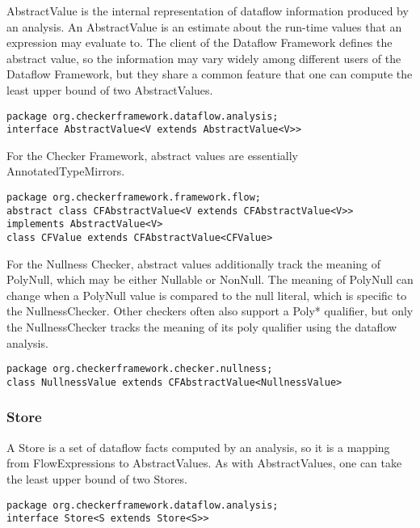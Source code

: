 AbstractValue is the internal representation of dataflow information
produced by an analysis.  An AbstractValue is an estimate about the
run-time values that an expression may evaluate to.  The client of the
Dataflow Framework defines the abstract value, so the information may
vary widely among different users of the Dataflow Framework, but they
share a common feature that one can compute the least upper bound of
two AbstractValues.

\begin{verbatim}
package org.checkerframework.dataflow.analysis;
interface AbstractValue<V extends AbstractValue<V>>
\end{verbatim}

For the Checker Framework, abstract values are essentially
AnnotatedTypeMirrors.

\begin{verbatim}
package org.checkerframework.framework.flow;
abstract class CFAbstractValue<V extends CFAbstractValue<V>> implements AbstractValue<V>
class CFValue extends CFAbstractValue<CFValue>
\end{verbatim}

For the Nullness Checker, abstract values additionally track the
meaning of PolyNull, which may be either Nullable or NonNull.  The
meaning of PolyNull can change when a PolyNull value is compared to
the null literal, which is specific to the NullnessChecker.  Other
checkers often also support a Poly* qualifier, but only the
NullnessChecker tracks the meaning of its poly qualifier using the
dataflow analysis.

\begin{verbatim}
package org.checkerframework.checker.nullness;
class NullnessValue extends CFAbstractValue<NullnessValue>
\end{verbatim}


\subsubsection{Store}
\label{sec:store_classes}

A Store is a set of dataflow facts computed by an analysis, so it is a
mapping from FlowExpressions to AbstractValues.  As with
AbstractValues, one can take the least upper bound of two Stores.

\begin{verbatim}
package org.checkerframework.dataflow.analysis;
interface Store<S extends Store<S>>
\end{verbatim}

